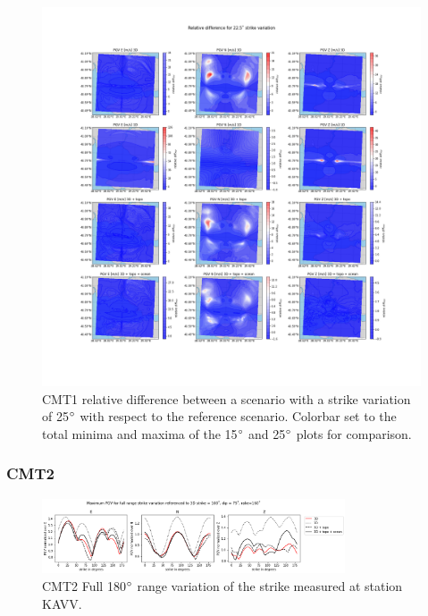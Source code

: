\documentclass[../Text/00main.tex]{subfiles}
\begin{document}
\begin{figure}[h]
    \centering
    \includegraphics[width=1.2\linewidth]{images_results/strike_variation_epsilon25_sc1.png}
    \caption{CMT1 relative difference between a scenario with a strike variation of 25$\degree$ with respect to the reference scenario. Colorbar set to the total minima and maxima of the 15$\degree$ and 25$\degree$ plots for comparison.}
    \label{fig:ref_eps25-1}
\end{figure}

\FloatBarrier

\subsubsection{CMT2}

\begin{figure}[!htp]
    \centering
    \includegraphics[width=0.8\textwidth]{images_results/fullrange2_strikevar_maxvals_sc2.png}
    \caption{CMT2 Full 180$\degree$ range variation of the strike measured at station KAVV.}
    \label{fig:KAVV_fullrange_2}
\end{figure}
\end{document}
